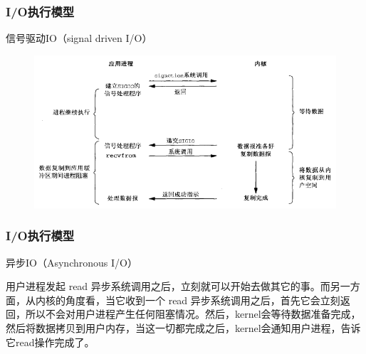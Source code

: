 \begin{frame}[fragile]
    \frametitle{I/O执行模型}
    信号驱动IO（signal driven I/O）
    \begin{figure}
        \includegraphics[width=0.7\linewidth]{figs/signal-io.png}
    \end{figure}
\end{frame}
\begin{frame}[fragile]
    \frametitle{I/O执行模型}
    异步IO（Asynchronous I/O）
    
    
    用户进程发起 read 异步系统调用之后，立刻就可以开始去做其它的事。而另一方面，从内核的角度看，当它收到一个 read 异步系统调用之后，首先它会立刻返回，所以不会对用户进程产生任何阻塞情况。然后，kernel会等待数据准备完成，然后将数据拷贝到用户内存，当这一切都完成之后，kernel会通知用户进程，告诉它read操作完成了。
    
    
    
\end{frame}

